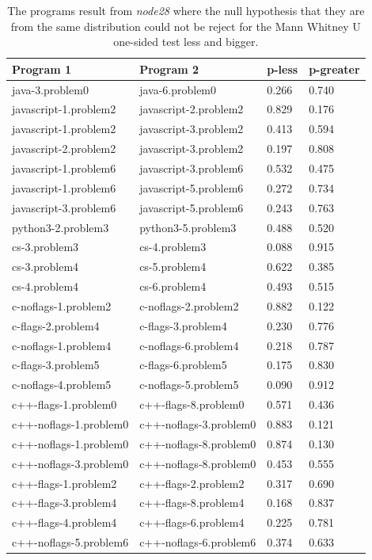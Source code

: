 \begin{appendices}
\begin{table}[h]
\centering
\begin{tabular}{|l|l|l|l|}
\hline
Program 1 & Program 2 & p-less & p-greater \\ \hline
java-3.problem0 & java-6.problem0 & 0.266 & 0.740 \\ \hline
javascript-1.problem2 & javascript-2.problem2 & 0.829 & 0.176 \\ \hline
javascript-1.problem2 & javascript-3.problem2 & 0.413 & 0.594 \\ \hline
javascript-2.problem2 & javascript-3.problem2 & 0.197 & 0.808 \\ \hline
javascript-1.problem6 & javascript-3.problem6 & 0.532 & 0.475 \\ \hline
javascript-1.problem6 & javascript-5.problem6 & 0.272 & 0.734 \\ \hline
javascript-3.problem6 & javascript-5.problem6 & 0.243 & 0.763 \\ \hline
python3-2.problem3 & python3-5.problem3 & 0.488 & 0.520 \\ \hline
cs-3.problem3 & cs-4.problem3 & 0.088 & 0.915 \\ \hline
cs-3.problem4 & cs-5.problem4 & 0.622 & 0.385 \\ \hline
cs-4.problem4 & cs-6.problem4 & 0.493 & 0.515 \\ \hline
c-noflags-1.problem2 & c-noflags-2.problem2 & 0.882 & 0.122 \\ \hline
c-flags-2.problem4 & c-flags-3.problem4 & 0.230 & 0.776 \\ \hline
c-noflags-1.problem4 & c-noflags-6.problem4 & 0.218 & 0.787 \\ \hline
c-flags-3.problem5 & c-flags-6.problem5 & 0.175 & 0.830 \\ \hline
c-noflags-4.problem5 & c-noflags-5.problem5 & 0.090 & 0.912 \\ \hline
c++-flags-1.problem0 & c++-flags-8.problem0 & 0.571 & 0.436 \\ \hline
c++-noflags-1.problem0 & c++-noflags-3.problem0 & 0.883 & 0.121 \\ \hline
c++-noflags-1.problem0 & c++-noflags-8.problem0 & 0.874 & 0.130 \\ \hline
c++-noflags-3.problem0 & c++-noflags-8.problem0 & 0.453 & 0.555 \\ \hline
c++-flags-1.problem2 & c++-flags-2.problem2 & 0.317 & 0.690 \\ \hline
c++-flags-3.problem4 & c++-flags-8.problem4 & 0.168 & 0.837 \\ \hline
c++-flags-4.problem4 & c++-flags-6.problem4 & 0.225 & 0.781 \\ \hline
c++-noflags-5.problem6 & c++-noflags-6.problem6 & 0.374 & 0.633 \\ \hline
\end{tabular}
\caption{The programs result from \textit{node28} where the null hypothesis that they are from the same distribution could not be reject for the Mann Whitney U one-sided test less and bigger.}
\label{tab:programs_equal3}
\end{table}


\end{appendices}
